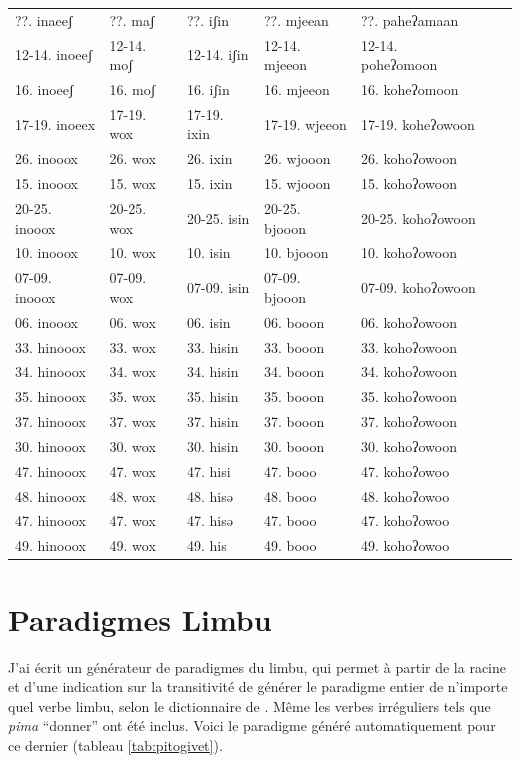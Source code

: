 \documentclass[oldfontcommands,oneside,a4paper,11pt]{memoir}
\begin{document}
\begin{table}[h]
{\begin{tabular}{lllllll}
	??. inaeeʃ 	&	??. maʃ 	&	??. iʃin 	&	??. mjeean 	&	??. paheʔamaan 	\\
	12-14. inoeeʃ 	&	12-14. moʃ 	&	12-14. iʃin 	&	12-14. mjeeon 	&	12-14. poheʔomoon 	\\
	16. inoeeʃ 	&	16. moʃ 	&	16. iʃin 	&	16. mjeeon 	&	16. koheʔomoon 	\\
	17-19. inoeex 	&	17-19. wox 	&	17-19. ixin 	&	17-19. wjeeon 	&	17-19. koheʔowoon 	\\
	26. inooox 	&	26. wox 	&	26. ixin 	&	26. wjooon 	&	26. kohoʔowoon 	\\
	15. inooox 	&	15. wox 	&	15. ixin 	&	15. wjooon 	&	15. kohoʔowoon 	\\
	20-25. inooox 	&	20-25. wox 	&	20-25. isin 	&	20-25. bjooon 	&	20-25. kohoʔowoon 	\\
	10. inooox 	&	10. wox 	&	10. isin 	&	10. bjooon 	&	10. kohoʔowoon 	\\
	07-09. inooox 	&	07-09. wox 	&	07-09. isin 	&	07-09. bjooon 	&	07-09. kohoʔowoon 	\\
	06. inooox 	&	06. wox 	&	06. isin 	&	06. booon 	&	06. kohoʔowoon 	\\
	33. hinooox 	&	33. wox 	&	33. hisin 	&	33. booon 	&	33. kohoʔowoon 	\\
	34. hinooox 	&	34. wox 	&	34. hisin 	&	34. booon 	&	34. kohoʔowoon 	\\
	35. hinooox 	&	35. wox 	&	35. hisin 	&	35. booon 	&	35. kohoʔowoon 	\\
	37. hinooox 	&	37. wox 	&	37. hisin 	&	37. booon 	&	37. kohoʔowoon 	\\
	30. hinooox 	&	30. wox 	&	30. hisin 	&	30. booon 	&	30. kohoʔowoon 	\\
	47. hinooox 	&	47. wox 	&	47. hisi 	&	47. booo 	&	47. kohoʔowoo 	\\
	48. hinooox 	&	48. wox 	&	48. hisə 	&	48. booo 	&	48. kohoʔowoo 	\\
	47. hinooox 	&	47. wox 	&	47. hisə 	&	47. booo 	&	47. kohoʔowoo 	\\
	49. hinooox 	&	49. wox 	&	49. his 	&	49. booo 	&	49. kohoʔowoo 	\\

\bottomrule
\end{tabular}}
\end{table}



\section{Paradigmes Limbu}
J'ai écrit un générateur de paradigmes du limbu, qui permet à partir de la racine et d'une indication sur la transitivité de générer le paradigme entier de n'importe quel verbe limbu, selon le dictionnaire de \citet{michailovsky02dico}. Même les verbes irréguliers tels que \textit{pima} ``donner'' ont été inclus. Voici le paradigme généré automatiquement pour ce dernier (tableau \ref{tab:pitogivet}).
\end{document}
